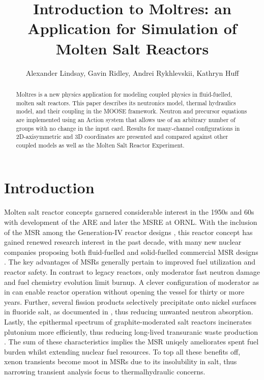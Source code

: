 \documentclass{article}
\title{Introduction to Moltres: an Application for Simulation of Molten Salt Reactors}
\author{Alexander Lindsay, Gavin Ridley, Andrei Rykhlevskii, Kathryn Huff}
\let\Oldsection\section
\renewcommand{\section}{\FloatBarrier\Oldsection}
\begin{document}
\maketitle

\begin{abstract}

Moltres is a new physics application for modeling coupled physics in
fluid-fuelled, molten salt reactors. This paper describes its neutronics model,
thermal hydraulics model, and their coupling in the MOOSE framework. Neutron
and precursor equations are implemented using an Action system that allows use
of an arbitrary number of groups with no change in the input card. Results for
many-channel configurations in 2D-axisymmetric and 3D coordinates are presented
and compared against other coupled models as well as the Molten Salt Reactor
Experiment.

\end{abstract}

\section{Introduction}

Molten salt reactor concepts garnered considerable interest in the 1950s and 60s
with development of the \gls{ARE} and later the \gls{MSRE} at \gls{ORNL}.  With
the inclusion of the \gls{MSR} among the Generation-IV reactor designs
\cite{gif_generation_2008,gif_generation_2015}, this reactor concept has gained renewed research
interest in the past decade, with many new nuclear companies proposing both
fluid-fuelled and solid-fuelled commercial \gls{MSR} designs
\cite{hyde_liquid_2015,leblanc_integral_2015,thorcon_-able_2017,scarlat_design_2014,transatomic_power_corporation_neutronics_2016}.
The key advantages of \gls{MSR}s generally pertain to improved fuel utilization
and reactor safety. In contrast to legacy reactors, only moderator fast neutron
damage and fuel chemistry evolution limit burnup. A clever configuration of moderator
as in \cite{engel_conceptual_1980} can enable reactor operation without opening the vessel
for thirty or more years. Further, several fission products selectively precipitate onto
nickel surfaces in fluoride salt, as documented in \cite{engel_conceptual_1980}, thus reducing
unwanted neutron absorption. Lastly, the epithermal spectrum of graphite-moderated salt reactors
incinerates plutonium more efficiently, thus reducing long-lived transuranic waste production \cite{engel_conceptual_1980}.
The sum of these characteristics implies the \gls{MSR} uniqely ameliorates spent fuel burden whilst
extending nuclear fuel resources. To top all these benefits off, xenon transients become moot in
\gls{MSR}s due to its insolubility in salt, thus narrowing transient analysis focus to thermalhydraulic
concerns.
\end{document}
